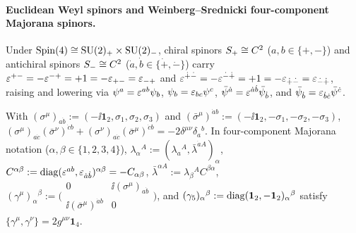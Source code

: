 \paragraph{Euclidean Weyl spinors and Weinberg--Srednicki four-component Majorana spinors.}
Under $\operatorname{Spin}(4) \cong \operatorname{SU}(2)_+ \times \operatorname{SU}(2)_-$, chiral spinors $S_+ \cong C^2$ ($a,b \in \{+,-\}$) and antichiral spinors $S_- \cong C^2$ ($\dot{a},\dot{b} \in \{\dot{+},\dot{-}\}$) carry $\varepsilon^{+-} = -\varepsilon^{-+} = +1 = -\varepsilon_{+-} = \varepsilon_{-+}$ and $\varepsilon^{\dot{+}\dot{-}} = -\varepsilon^{\dot{-}\dot{+}} = +1 = -\varepsilon_{\dot{+}\dot{-}} = \varepsilon_{\dot{-}\dot{+}}$, raising and lowering via $\psi^a = \varepsilon^{ab}\psi_b$, $\psi_b = \varepsilon_{bc}\psi^c$, $\bar{\psi}^{\dot{a}} = \varepsilon^{\dot{a}\dot{b}}\bar{\psi}_{\dot{b}}$, and $\bar{\psi}_{\dot{b}} = \varepsilon_{\dot{b}\dot{c}}\bar{\psi}^{\dot{c}}$.

With $(\sigma^\mu)_{a\dot{b}} := (-\ii\mathbf{1}_2, \sigma_1, \sigma_2, \sigma_3)$ and $(\bar{\sigma}^\mu)^{\dot{a}b} := (-\ii\mathbf{1}_2, -\sigma_1, -\sigma_2, -\sigma_3)$, $(\sigma^\mu)_{a\dot{c}}(\bar{\sigma}^\nu)^{\dot{c}b} + (\sigma^\nu)_{a\dot{c}}(\bar{\sigma}^\mu)^{\dot{c}b} = -2\delta^{\mu\nu}\delta_a{}^b$. In four-component Majorana notation ($\alpha,\beta \in \{1,2,3,4\}$), $\lambda_\alpha{}^A := (\lambda_a{}^A, \bar{\lambda}^{\dot{a}A})_\alpha$, $C^{\alpha\beta} := \operatorname{diag}(\varepsilon^{ab}, \varepsilon_{\dot{a}\dot{b}})^{\alpha\beta} = -C_{\alpha\beta}$, $\bar{\lambda}^{\alpha A} := \lambda_\beta{}^A C^{\beta\alpha}$, $(\gamma^\mu)_\alpha{}^\beta := \bigl(\begin{smallmatrix}0 & \ii(\sigma^\mu)_{a\dot{b}}\\ \ii(\bar{\sigma}^\mu)^{\dot{a}b} & 0\end{smallmatrix}\bigr)$, and $(\gamma_5)_\alpha{}^\beta := \operatorname{diag}(\mathbf{1}_2, -\mathbf{1}_2)_\alpha{}^\beta$ satisfy $\{\gamma^\mu, \gamma^\nu\} = 2g^{\mu\nu}\mathbf{1}_4$.

